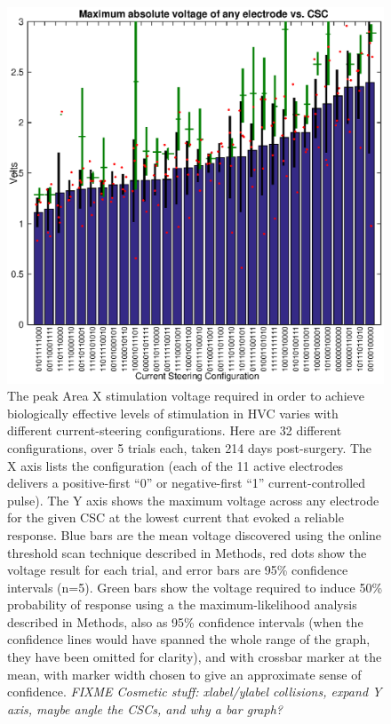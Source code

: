 \documentclass[10pt,letterpaper]{article}
\begin{document}
\begin{figure}
  \includegraphics[width=\textwidth]{VoltageVsCSC}
  \caption{The peak Area X stimulation voltage required in order to
    achieve biologically effective levels of stimulation in HVC varies
    with different current-steering configurations.  Here are 32
    different configurations, over 5 trials each, taken 214 days
    post-surgery.  The X axis lists the configuration (each of the 11
    active electrodes delivers a positive-first ``0'' or
    negative-first ``1'' current-controlled pulse).  The Y axis shows
    the maximum voltage across any electrode for the given CSC at the
    lowest current that evoked a reliable response.  Blue bars are the
    mean voltage discovered using the online threshold scan technique
    described in Methods, red dots show the voltage result for each
    trial, and error bars are 95\% confidence intervals (n=5).  Green
    bars show the voltage required to induce 50\% probability of
    response using a the maximum-likelihood analysis described in
    Methods, also as 95\% confidence intervals (when the confidence
    lines would have spanned the whole range of the graph, they have
    been omitted for clarity), and with crossbar marker at the mean,
    with marker width chosen to give an approximate sense of
    confidence. {\em FIXME Cosmetic stuff: xlabel/ylabel collisions, expand Y axis, maybe angle the CSCs, and why a bar graph?}}
  \label{fig:VoltageVsCSC}
\end{figure}
\end{document}
